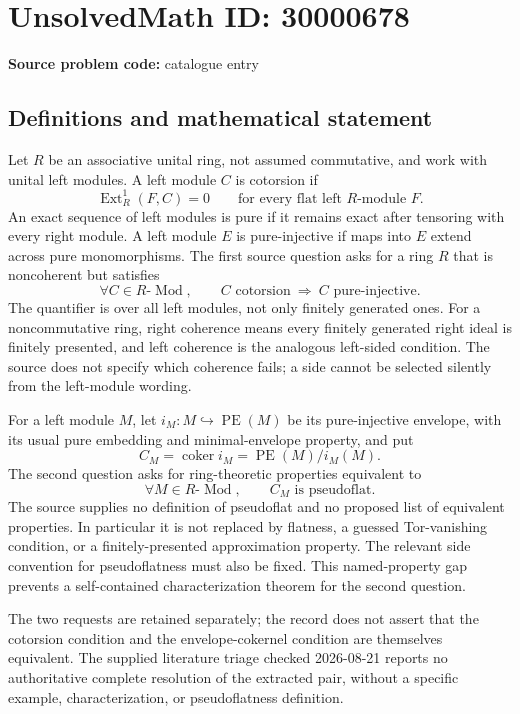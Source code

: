 \documentclass[11pt]{article}
\begin{document}
\section*{UnsolvedMath ID: 30000678}
\textbf{Source problem code:} catalogue entry
\subsection{Definitions and mathematical statement}
Let \(R\) be an associative unital ring, not assumed commutative, and work with unital left modules. A left module \(C\) is cotorsion if
\[
\operatorname{Ext}_R^1(F,C)=0\qquad\text{for every flat left }R\text{-module }F.
\]
An exact sequence of left modules is pure if it remains exact after tensoring with every right module. A left module \(E\) is pure-injective if maps into \(E\) extend across pure monomorphisms. The first source question asks for a ring \(R\) that is noncoherent but satisfies
\[
\forall C\in R\text{-}\operatorname{Mod},\qquad
C\text{ cotorsion}\ \Longrightarrow\ C\text{ pure-injective}.
\]
The quantifier is over all left modules, not only finitely generated ones. For a noncommutative ring, right coherence means every finitely generated right ideal is finitely presented, and left coherence is the analogous left-sided condition. The source does not specify which coherence fails; a side cannot be selected silently from the left-module wording.

For a left module \(M\), let \(i_M:M\hookrightarrow\operatorname{PE}(M)\) be its pure-injective envelope, with its usual pure embedding and minimal-envelope property, and put
\[
C_M=\operatorname{coker}i_M=\operatorname{PE}(M)/i_M(M).
\]
The second question asks for ring-theoretic properties equivalent to
\[
\forall M\in R\text{-}\operatorname{Mod},\qquad C_M\text{ is pseudoflat}.
\]
The source supplies no definition of pseudoflat and no proposed list of equivalent properties. In particular it is not replaced by flatness, a guessed Tor-vanishing condition, or a finitely-presented approximation property. The relevant side convention for pseudoflatness must also be fixed. This named-property gap prevents a self-contained characterization theorem for the second question.

The two requests are retained separately; the record does not assert that the cotorsion condition and the envelope-cokernel condition are themselves equivalent. The supplied literature triage checked 2026-08-21 reports no authoritative complete resolution of the extracted pair, without a specific example, characterization, or pseudoflatness definition.
\end{document}
